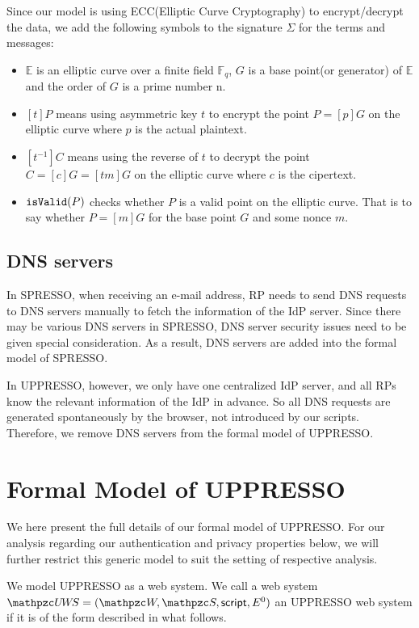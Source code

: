 Since our model is using ECC(Elliptic Curve Cryptography) to encrypt/decrypt the data,
we add the following symbols to the signature $\Sigma$ for the terms and messages:

\begin{itemize}
  \item $\mathbb{E}$ is an elliptic curve over a finite field $\mathbb{F}_q$, $G$ is a base point(or generator) of $\mathbb{E}$ and the order of $G$ is a prime number n.
  \item $[t]P$ means using asymmetric key $t$ to encrypt the point $P=[p]G$ on the elliptic curve where $p$ is the actual plaintext.
  \item $[t^{-1}]C$ means using the reverse of $t$ to decrypt the point $C=[c]G=[tm]G$ on the elliptic curve where $c$ is the cipertext.  
  \item $\mathtt{isValid}(P)$ checks whether $P$ is a valid point on the elliptic curve. That is to say whether $P=[m]G$ for the base point $G$ and some nonce $m$.
\end{itemize}

\subsection{DNS servers}


In SPRESSO, when receiving an e-mail address, 
RP needs to send DNS requests to DNS servers manually 
to fetch the information of the IdP server. 
Since there may be various DNS servers in SPRESSO, 
DNS server security issues need to be given special consideration.
As a result, DNS servers are added into the formal model of SPRESSO.

In UPPRESSO, however, we only have one centralized IdP server, and 
all RPs know the relevant information of the IdP in advance.
So all DNS requests are generated spontaneously by the browser, 
not introduced by our scripts.
Therefore, we remove DNS servers from the formal model of UPPRESSO.

\section{Formal Model of UPPRESSO}
\label{app:model-uppresso}
We here present the full details of our formal model of UPPRESSO. For our analysis regarding our authentication and privacy properties below, we will further restrict this generic model to suit the setting of respective analysis.\par
We model UPPRESSO as a web system. We call a web system $\uppressowebsystem=(\bidsystem, \scriptset, \mathsf{script}, E^0)$ an UPPRESSO web system if it is of the form described in what follows.

